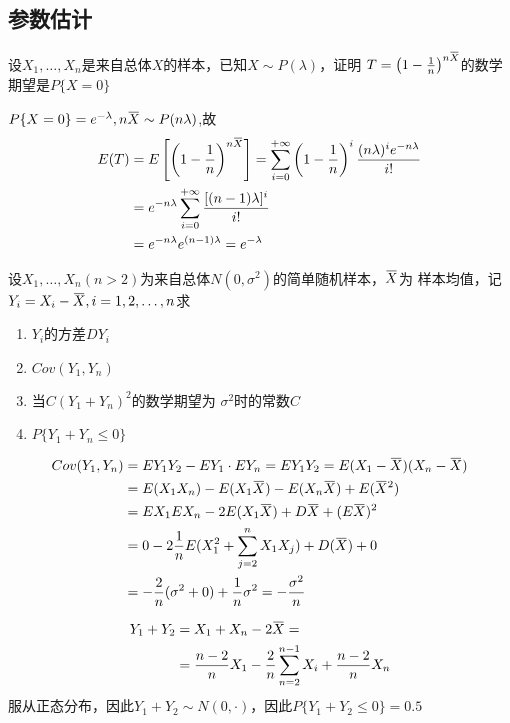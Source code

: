 \documentclass{article}
\begin{document}
\subsection{参数估计}
\label{sec:org863d8d4}
\begin{examplle}[]
设\(X_1,\dots,X_n\)是来自总体\(X\)的样本，已知\(X\sim P(\lambda)\)，证明
\(T=\left(1-\frac{1}{n}\right)^{n\bbar{X}}\)的数学期望是\(P\{X=0\}\)

\(P\{X=0\}=e^{-\lambda},n\bbar{X}\sim P(n\lambda)\),故
\begin{align*}
E(T)&=E\left[\left(1-\frac{1}{n}\right)^{n\bbar{X}}\right]=
\sum_{i=0}^{+\infty}\left(1-\frac{1}{n}\right)^i\frac{(n\lambda)^ie^{-n\lambda}}{i!}\\
&=e^{-n\lambda}\sum_{i=0}^{+\infty}\frac{[(n-1)\lambda]^i}{i!}\\
&=e^{-n\lambda}e^{(n-1)\lambda}=e^{-\lambda}
\end{align*}
\end{examplle}

\begin{examplle}[]
设\(X_1,\dots,X_n(n>2)\)为来自总体\(N(0,\sigma^2)\)的简单随机样本，\(\bbar{X}\)为
样本均值，记\(Y_i=X_i-\bbar{X},i=1,2,\dots,n\)求
\begin{enumerate}
\item \(Y_i\)的方差\(DY_i\)
\item \(Cov(Y_1,Y_n)\)
\item 当\(C(Y_1+Y_n)^2\)的数学期望为 \(\sigma^2\)时的常数\(C\)
\item \(P\{Y_1+Y_n\le0\}\)
\end{enumerate}


\begin{align*}
Cov(Y_1,Y_n)&=EY_1Y_2-EY_1\cdot EY_n=EY_1Y_2=E(X_1-\bbar{X})(X_n-\bbar{X})\\
&=E(X_1X_n)-E(X_1\bbar{X})-E(X_n\bbar{X})+E(\bbar{X}^2)\\
&=EX_1EX_n-2E(X_1\bbar{X})+D\bbar{X}+(E\bbar{X})^2\\
&=0-2\frac{1}{n}E(X_1^2+\sum_{j=2}^nX_1X_j)+D(\bbar{X})+0\\
&=-\frac{2}{n}(\sigma^2+0)+\frac{1}{n}\sigma^2=-\frac{\sigma^2}{n}
\end{align*}

\begin{align*}
Y_1+Y_2&=X_1+X_n-2\bbar{X}=\\
&=\frac{n-2}{n}X_1-\frac{2}{n}\sum_{n=2}^{n-1}X_i+\frac{n-2}{n}X_n
\end{align*}
服从正态分布，因此\(Y_1+Y_2\sim N(0,\cdot)\)，因此\(P\{Y_1+Y_2\le0\}=0.5\)
\end{examplle}
\end{document}
